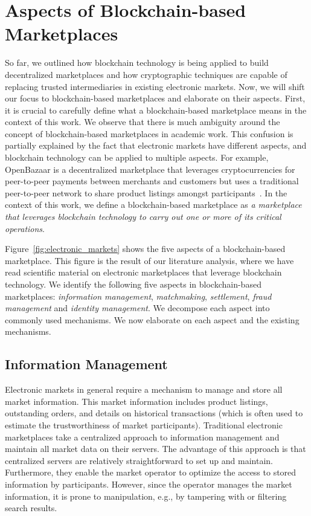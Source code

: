 \section{Aspects of Blockchain-based Marketplaces}
So far, we outlined how blockchain technology is being applied to build decentralized marketplaces and how cryptographic techniques are capable of replacing trusted intermediaries in existing electronic markets.
Now, we will shift our focus to blockchain-based marketplaces and elaborate on their aspects.
First, it is crucial to carefully define what a blockchain-based marketplace means in the context of this work.
We observe that there is much ambiguity around the concept of blockchain-based marketplaces in academic work.
This confusion is partially explained by the fact that electronic markets have different aspects, and blockchain technology can be applied to multiple aspects.
For example, OpenBazaar is a decentralized marketplace that leverages cryptocurrencies for peer-to-peer payments between merchants and customers but uses a traditional peer-to-peer network to share product listings amongst participants~\cite{openbazaar}.
In the context of this work, we define a blockchain-based marketplace as \emph{a marketplace that leverages blockchain technology to carry out one or more of its critical operations}.

Figure~\ref{fig:electronic_markets} shows the five aspects of a blockchain-based marketplace.
This figure is the result of our literature analysis, where we have read scientific material on electronic marketplaces that leverage blockchain technology.
We identify the following five aspects in blockchain-based marketplaces: \emph{information management}, \emph{matchmaking}, \emph{settlement}, \emph{fraud management} and \emph{identity management}.
We decompose each aspect into commonly used mechanisms.
We now elaborate on each aspect and the existing mechanisms.

\subsection{Information Management}
Electronic markets in general require a mechanism to manage and store all market information.
This market information includes product listings, outstanding orders, and details on historical transactions (which is often used to estimate the trustworthiness of market participants).
Traditional electronic marketplaces take a centralized approach to information management and maintain all market data on their servers.
The advantage of this approach is that centralized servers are relatively straightforward to set up and maintain.
Furthermore, they enable the market operator to optimize the access to stored information by participants.
However, since the operator manages the market information, it is prone to manipulation, e.g., by tampering with or filtering search results.


